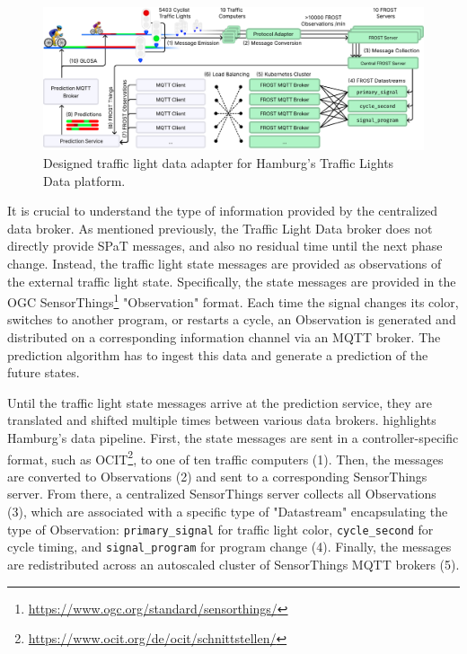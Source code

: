 \begin{figure}[t]
\centering
\includegraphics[width=\linewidth]{images/traffic-light-data-infrastructure.pdf}
\caption{Designed traffic light data adapter for Hamburg's Traffic Lights Data platform.}
\label{fig:traffic-light-data-infrastructure}
\end{figure}

It is crucial to understand the type of information provided by the centralized data broker. As mentioned previously, the Traffic Light Data broker does not directly provide SPaT messages, and also no residual time until the next phase change. Instead, the traffic light state messages are provided as observations of the external traffic light state. Specifically, the state messages are provided in the OGC SensorThings\footnote{\url{https://www.ogc.org/standard/sensorthings/}} "Observation" format. Each time the signal changes its color, switches to another program, or restarts a cycle, an Observation is generated and distributed on a corresponding information channel via an MQTT broker. The prediction algorithm has to ingest this data and generate a prediction of the future states.

Until the traffic light state messages arrive at the prediction service, they are translated and shifted multiple times between various data brokers.  highlights Hamburg's data pipeline. First, the state messages are sent in a controller-specific format, such as OCIT\footnote{\url{https://www.ocit.org/de/ocit/schnittstellen/}}, to one of ten traffic computers (1). Then, the messages are converted to Observations (2) and sent to a corresponding SensorThings server. From there, a centralized SensorThings server collects all Observations (3), which are associated with a specific type of "Datastream" encapsulating the type of Observation: \texttt{primary\_signal} for traffic light color, \texttt{cycle\_second} for cycle timing, and \texttt{signal\_program} for program change (4). Finally, the messages are redistributed across an autoscaled cluster of SensorThings MQTT brokers (5). 

